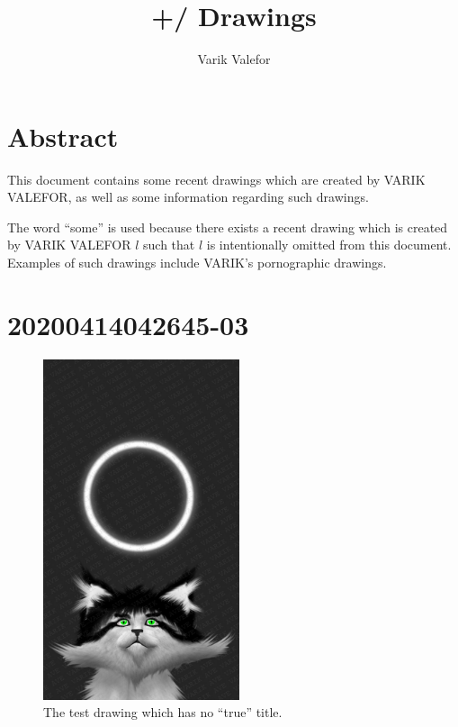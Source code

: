 \documentclass{report}
\title{+/ Drawings}
\author{Varik Valefor}
\newcommand\imageheight{10cm}
\begin{document}
\maketitle{}
\tableofcontents{}
\chapter{Abstract}
This document contains some recent drawings which are created by VARIK VALEFOR, as well as some information regarding such drawings.

The word ``some'' is used because there exists a recent drawing which is created by VARIK VALEFOR $l$ such that $l$ is intentionally omitted from this document.  Examples of such drawings include VARIK's pornographic drawings.
\chapter{20200414042645-03}
\begin{figure}[ht]
	\centering
	\includegraphics[height=\imageheight]{20200414042645-03/20200414042645-03.jpg}
	\caption[center]{The test drawing which has no ``true'' title.}
\end{figure}
\end{document}

